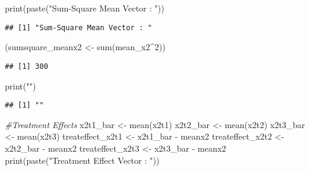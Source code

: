 \documentclass[
]{article}
\newenvironment{Shaded}{\begin{snugshade}}{\end{snugshade}}
\newcommand{\CommentTok}[1]{\textcolor[rgb]{0.56,0.35,0.01}{\textit{#1}}}
\newcommand{\DecValTok}[1]{\textcolor[rgb]{0.00,0.00,0.81}{#1}}
\newcommand{\FunctionTok}[1]{\textcolor[rgb]{0.00,0.00,0.00}{#1}}
\newcommand{\NormalTok}[1]{#1}
\newcommand{\OtherTok}[1]{\textcolor[rgb]{0.56,0.35,0.01}{#1}}
\newcommand{\SpecialCharTok}[1]{\textcolor[rgb]{0.00,0.00,0.00}{#1}}
\newcommand{\StringTok}[1]{\textcolor[rgb]{0.31,0.60,0.02}{#1}}
\begin{document}
\begin{Shaded}
\begin{Highlighting}[]
\FunctionTok{print}\NormalTok{(}\FunctionTok{paste}\NormalTok{(}\StringTok{"Sum{-}Square Mean Vector : "}\NormalTok{))}
\end{Highlighting}
\end{Shaded}

\begin{verbatim}
## [1] "Sum-Square Mean Vector : "
\end{verbatim}

\begin{Shaded}
\begin{Highlighting}[]
\NormalTok{(sumsquare\_meanx2 }\OtherTok{\textless{}{-}} \FunctionTok{sum}\NormalTok{(mean\_x2}\SpecialCharTok{\^{}}\DecValTok{2}\NormalTok{)) }
\end{Highlighting}
\end{Shaded}

\begin{verbatim}
## [1] 300
\end{verbatim}

\begin{Shaded}
\begin{Highlighting}[]
\FunctionTok{print}\NormalTok{(}\StringTok{""}\NormalTok{)}
\end{Highlighting}
\end{Shaded}

\begin{verbatim}
## [1] ""
\end{verbatim}

\begin{Shaded}
\begin{Highlighting}[]
\CommentTok{\#Treatment Effects}
\NormalTok{x2t1\_bar }\OtherTok{\textless{}{-}} \FunctionTok{mean}\NormalTok{(x2t1)}
\NormalTok{x2t2\_bar }\OtherTok{\textless{}{-}} \FunctionTok{mean}\NormalTok{(x2t2)}
\NormalTok{x2t3\_bar }\OtherTok{\textless{}{-}} \FunctionTok{mean}\NormalTok{(x2t3)}
\NormalTok{treateffect\_x2t1 }\OtherTok{\textless{}{-}}\NormalTok{ x2t1\_bar }\SpecialCharTok{{-}}\NormalTok{ meanx2}
\NormalTok{treateffect\_x2t2 }\OtherTok{\textless{}{-}}\NormalTok{ x2t2\_bar }\SpecialCharTok{{-}}\NormalTok{ meanx2}
\NormalTok{treateffect\_x2t3 }\OtherTok{\textless{}{-}}\NormalTok{ x2t3\_bar }\SpecialCharTok{{-}}\NormalTok{ meanx2}
\FunctionTok{print}\NormalTok{(}\FunctionTok{paste}\NormalTok{(}\StringTok{"Treatment Effect Vector : "}\NormalTok{))}
\end{Highlighting}
\end{Shaded}
\end{document}
